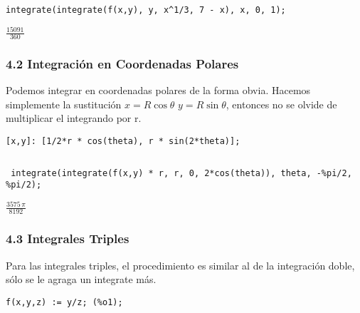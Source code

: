 \documentclass[12pt]{article}
\begin{document}
\begin{verbatim}
integrate(integrate(f(x,y), y, x^1/3, 7 - x), x, 0, 1);
\end{verbatim}


\begin{math}
\frac{15091}{360}
\end{math}

\subsubsection*{4.2 Integración en Coordenadas Polares}

Podemos integrar en coordenadas polares de la forma obvia. Hacemos simplemente la sustitución $x = R\cos\theta$ $y = R \sin\theta$, entonces no se olvide de multiplicar el integrando por r.


\noindent

\begin{verbatim}
[x,y]: [1/2*r * cos(theta), r * sin(2*theta)];
\end{verbatim}


\begin{math}
[\frac{r\,\mathrm{cos}\left( \theta\right) }{2},r\,\mathrm{sin}\left( 2\,\theta\right) ]
\end{math}


\noindent

\begin{verbatim}
 integrate(integrate(f(x,y) * r, r, 0, 2*cos(theta)), theta, -%pi/2, %pi/2);
\end{verbatim}


\begin{math}
\frac{3575\,\pi }{8192}
\end{math}

\subsubsection*{4.3 Integrales Triples}

Para las integrales triples, el procedimiento es similar al de la integración doble, sólo se le agraga un integrate más.


\noindent

\begin{verbatim}
f(x,y,z) := y/z; (%o1);
\end{verbatim}
\end{document}

